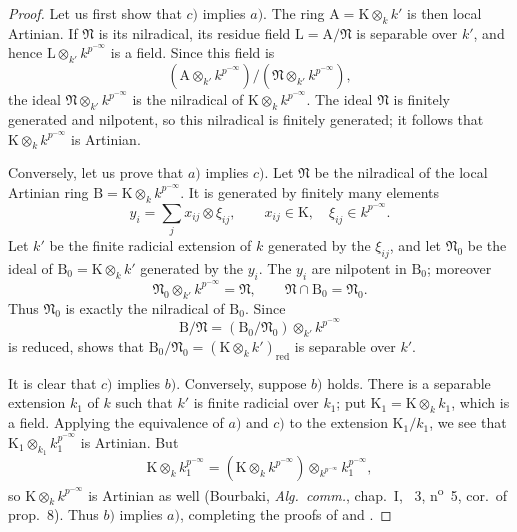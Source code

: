 \begin{proof}
Let us first show that $c)$ implies $a)$.
The ring $\mathrm{A}=\mathrm{K}\otimes_kk'$ is then local Artinian. If $\mathfrak N$ is its nilradical, its residue field $\mathrm{L}=\mathrm{A}/\mathfrak N$ is separable over $k'$, and hence $\mathrm{L}\otimes_{k'}k^{p^{-\infty}}$ is a field. Since this field is
\[
  (\mathrm{A}\otimes_{k'}k^{p^{-\infty}})/(\mathfrak N\otimes_{k'}k^{p^{-\infty}}),
\]
the ideal $\mathfrak N\otimes_{k'}k^{p^{-\infty}}$ is the nilradical of $\mathrm{K}\otimes_kk^{p^{-\infty}}$. The ideal $\mathfrak N$ is finitely generated and nilpotent, so this nilradical is finitely generated; it follows that $\mathrm{K}\otimes_kk^{p^{-\infty}}$ is Artinian.

Conversely, let us prove that $a)$ implies $c)$.
Let $\mathfrak N$ be the nilradical of the local Artinian ring $\mathrm{B}=\mathrm{K}\otimes_kk^{p^{-\infty}}$. It is generated by finitely many elements
\[
  y_i=\sum_j x_{ij}\otimes\xi_{ij},
  \qquad x_{ij}\in\mathrm{K},\quad \xi_{ij}\in k^{p^{-\infty}}.
\]
Let $k'$ be the finite radicial extension of $k$ generated by the $\xi_{ij}$, and let $\mathfrak N_0$ be the ideal of $\mathrm{B}_0=\mathrm{K}\otimes_kk'$ generated by the $y_i$. The $y_i$ are nilpotent in $\mathrm{B}_0$; moreover
\[
  \mathfrak N_0\otimes_{k'}k^{p^{-\infty}}=\mathfrak N,
  \qquad
  \mathfrak N\cap\mathrm{B}_0=\mathfrak N_0.
\]
Thus $\mathfrak N_0$ is exactly the nilradical of $\mathrm{B}_0$. Since
\[
  \mathrm{B}/\mathfrak N=(\mathrm{B}_0/\mathfrak N_0)\otimes_{k'}k^{p^{-\infty}}
\]
is reduced,  shows that $\mathrm{B}_0/\mathfrak N_0=(\mathrm{K}\otimes_kk')_{\mathrm{red}}$ is separable over $k'$.

It is clear that $c)$ implies $b)$.
Conversely, suppose $b)$ holds. There is a separable extension $k_1$ of $k$ such that $k'$ is finite radicial over $k_1$; put $\mathrm{K}_1=\mathrm{K}\otimes_kk_1$, which is a field. Applying the equivalence of $a)$ and $c)$ to the extension $\mathrm{K}_1/k_1$, we see that $\mathrm{K}_1\otimes_{k_1}k_1^{p^{-\infty}}$ is Artinian. But
\[
  \mathrm{K}\otimes_kk_1^{p^{-\infty}}
  =(\mathrm{K}\otimes_kk^{p^{-\infty}})
   \otimes_{k^{p^{-\infty}}}k_1^{p^{-\infty}},
\]
so $\mathrm{K}\otimes_kk^{p^{-\infty}}$ is Artinian as well (Bourbaki, \emph{Alg.\ comm.}, chap.~I, \textsection~3, n\textsuperscript{o}~5, cor.\ of prop.~8). Thus $b)$ implies $a)$, completing the proofs of  and .
\end{proof}


